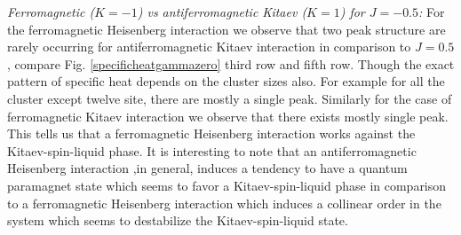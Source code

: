 \documentclass[aps,amsmath,twocolumn,amssymb,floatfix,showpacs,superscriptaddress,nofootinbib,longbibliography]{revtex4-1}
\begin{document}
\indent
{\it \small{Ferromagnetic ($K=-1$) vs antiferromagnetic Kitaev ($K=1$) for $J=-0.5$:}} For the ferromagnetic Heisenberg interaction we observe that two peak structure are rarely occurring for antiferromagnetic Kitaev
interaction in comparison to $J=0.5$, compare Fig. \ref{specificheatgammazero} third row and fifth row.
Though the exact pattern of specific heat depends on the cluster sizes also. For example for all the cluster except twelve site, there are mostly a single peak. Similarly for the case of ferromagnetic Kitaev interaction we observe that there exists mostly single peak. This tells us that a ferromagnetic Heisenberg interaction works against the Kitaev-spin-liquid phase. It is interesting to note that an antiferromagnetic Heisenberg interaction
,in general, induces a  tendency to have a quantum paramagnet state which seems to favor a Kitaev-spin-liquid phase in comparison to a ferromagnetic Heisenberg interaction which induces a collinear order in the system which seems to destabilize the Kitaev-spin-liquid state. \\
\indent
\end{document}
